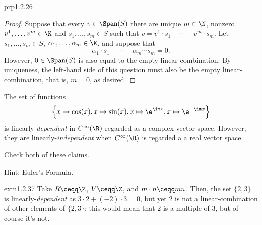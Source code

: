 \begin{prp}{}{prp1.2.26}
\begin{proof}
		\blni
		Suppose that every $v\in \Span (S)$ there are unique $m\in \N$, nonzero $v^1,\ldots ,v^m\in \K$ and $s_1,\ldots ,s_m\in S$ such that $v=v^1\cdot s_1+\cdots +v^m\cdot s_m$.  Let $s_1,\ldots ,s_m\in S$, $\alpha _1,\ldots ,\alpha _m\in \K$, and suppose that
		\begin{equation}
		\alpha _1\cdot s_1+\cdots +\alpha _m\cdots s_m=0.
		\end{equation}
		However, $0\in \Span (S)$ is also equal to the empty linear combination.  By uniqueness, the left-hand side of this question must also be the empty linear-combination, that is, $m=0$, as desired.
	\end{proof}
\end{prp}
\begin{exm}{}{}
	The set of functions
	\begin{equation}
		\left\{ x\mapsto \cos (x),x\mapsto \sin (x),x\mapsto \e ^{\im x},x\mapsto \e ^{-\im x}\right\} 
	\end{equation}
	is linearly-\emph{dependent} in $C^{\infty}(\R )$ regarded as a complex vector space.  However, they are linearly-\emph{independent} when $C^{\infty}(\R )$ is regarded a a real vector space.
	\begin{exr}[breakable=false]{}{}
		Check both of these claims.
		\begin{rmk}
			Hint:  Euler's Formula.
		\end{rmk}
	\end{exr}
\end{exm}
\begin{exm}{}{exm1.2.37}
	Take $R\ceqq \Z$, $V\ceqq \Z$, and $m\cdot n\ceqq mn$.  Then, the set $\{ 2,3\}$ is linearly-\emph{dependent} as $3\cdot 2+(-2)\cdot 3=0$, but yet $2$ is not a linear-combination of other elements of $\{ 2,3\}$:  this would mean that $2$ is a multiple of $3$, but of course it's not.
\end{exm}
